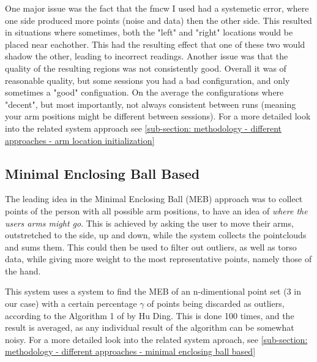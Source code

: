 One major issue was the fact that the fmcw I used had a systemetic error, where one side produced more points (noise and data) then the other side. 
This resulted in situations where sometimes, both the "left" and "right" locations would be placed near eachother. 
This had the resulting effect that one of these two would shadow the other, leading to incorrect readings.
Another issue was that the quality of the resulting regions was not consistently good. 
Overall it was of reasonable quality, but some sessions you had a bad configuration, and only sometimes a "good" configuation.
On the average the configurations where "decent", but most importantly, not always consistent between runs (meaning your arm positions might be different between sessions).
For a more detailed look into the related system approach see \cref{sub-section: methodology - different approaches - arm location initialization}


\subsection{Minimal Enclosing Ball Based}
\label{sub-section: methodology - pre config - minimal enclosing ball based}
The leading idea in the Minimal Enclosing Ball (MEB) approach was to collect points of the person with all possible arm positions, to have an idea of \textit{where the users arms might go}.
This is achieved by asking the user to move their arms, outstretched to the side, up and down, while the system collects the pointclouds and sums them.
This could then be used to filter out outliers, as well as torso data, while giving more weight to the most representative points, namely those of the hand.

This system uses a system to find the MEB of an n-dimentional point set (3 in our case) with a certain percentage $\gamma$ of points being discarded as outliers, according to the Algorithm 1 of \cite{ding2020sublineartimeframeworkgeometric} by Hu Ding.
This is done 100 times, and the result is averaged, as any individual result of the algorithm can be somewhat noisy.
For a more detailed look into the related system aproach, see \cref{sub-section: methodology - different approaches - minimal enclosing ball based}

